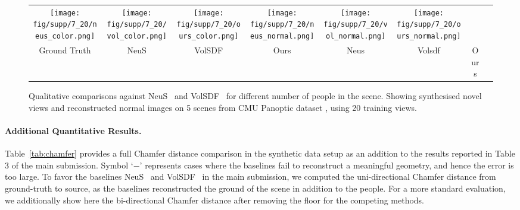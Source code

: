 \begin{figure*}[ht]
{\begin{tabular}{c cccc ccc}
\texttt{[image: fig/supp/7\_20/neus\_color.png]} &
\texttt{[image: fig/supp/7\_20/vol\_color.png]} &
\texttt{[image: fig/supp/7\_20/ours\_color.png]} &
\texttt{[image: fig/supp/7\_20/neus\_normal.png]} &
\texttt{[image: fig/supp/7\_20/vol\_normal.png]} &
\texttt{[image: fig/supp/7\_20/ours\_normal.png]} \\
Ground Truth &NeuS &VolSDF & Ours  & Neus &Volsdf & Ours\\
\end{tabular}}
 \caption{Qualitative comparisons against NeuS~\cite{wang2021neus} and VolSDF~\cite{yariv2021volume} for different number of people in the scene. Showing synthesised novel views and reconstructed normal images on 5 scenes from CMU Panoptic dataset \cite{Simon_2017_CVPR,Joo_2017_TPAMI}, using 20 training views.} 
\label{fig:cmu} 
\end{figure*}

\paragraph{Additional Quantitative Results.}
Table~\ref{tab:chamfer} provides a full Chamfer distance comparison in the synthetic data setup as an addition to the results reported in Table 3 of the main submission. Symbol `$-$' represents cases where the baselines fail to reconstruct a meaningful geometry, and hence the error is too large. To favor the baselines NeuS~\cite{wang2021neus} and VolSDF~\cite{yariv2021volume} in the main submission, we computed the uni-directional Chamfer distance from ground-truth to source, as the baselines reconstructed the ground of the scene in addition to the people. For a more standard evaluation, we additionally show here the bi-directional Chamfer distance after removing the floor for the competing methods. 


